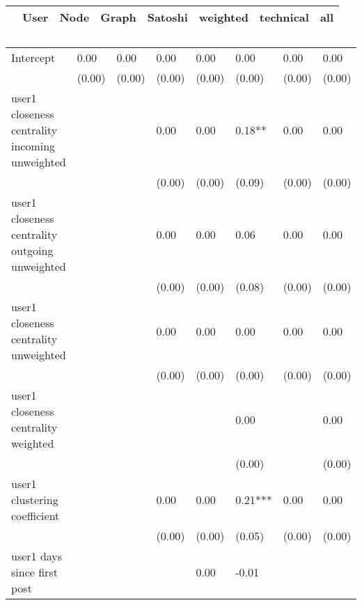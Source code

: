 \begin{table}
\caption{}
\begin{center}
\begin{tabular}{lccccccc}
\hline
                                               &   User  &   Node  &  Graph  & Satoshi & weighted & technical &   all    \\
\hline
\hline
\end{tabular}
\begin{tabular}{llllllll}
Intercept                                      & 0.00    & 0.00    & 0.00    & 0.00    & 0.00     & 0.00      & 0.00     \\
                                               & (0.00)  & (0.00)  & (0.00)  & (0.00)  & (0.00)   & (0.00)    & (0.00)   \\
user1 closeness centrality incoming unweighted &         &         & 0.00    & 0.00    & 0.18**   & 0.00      & 0.00     \\
                                               &         &         & (0.00)  & (0.00)  & (0.09)   & (0.00)    & (0.00)   \\
user1 closeness centrality outgoing unweighted &         &         & 0.00    & 0.00    & 0.06     & 0.00      & 0.00     \\
                                               &         &         & (0.00)  & (0.00)  & (0.08)   & (0.00)    & (0.00)   \\
user1 closeness centrality unweighted          &         &         & 0.00    & 0.00    & 0.00     & 0.00      & 0.00     \\
                                               &         &         & (0.00)  & (0.00)  & (0.00)   & (0.00)    & (0.00)   \\
user1 closeness centrality weighted            &         &         &         &         & 0.00     &           & 0.00     \\
                                               &         &         &         &         & (0.00)   &           & (0.00)   \\
user1 clustering coefficient                   &         &         & 0.00    & 0.00    & 0.21***  & 0.00      & 0.00     \\
                                               &         &         & (0.00)  & (0.00)  & (0.05)   & (0.00)    & (0.00)   \\
user1 days since first post                    &         &         &         & 0.00    & -0.01    &           &          \\

\end{tabular}
\end{center}
\end{table}
